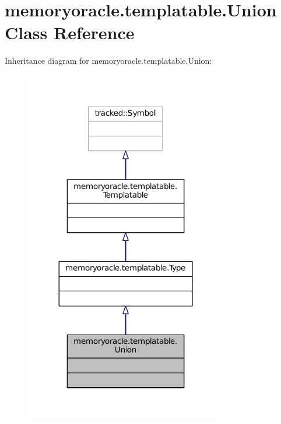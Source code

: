 \hypertarget{classmemoryoracle_1_1templatable_1_1Union}{}\section{memoryoracle.\+templatable.\+Union Class Reference}
\label{classmemoryoracle_1_1templatable_1_1Union}


Inheritance diagram for memoryoracle.\+templatable.\+Union\+:\nopagebreak
\begin{figure}[H]
\begin{center}
\leavevmode
\includegraphics[width=251pt]{classmemoryoracle_1_1templatable_1_1Union__inherit__graph}
\end{center}
\end{figure}


